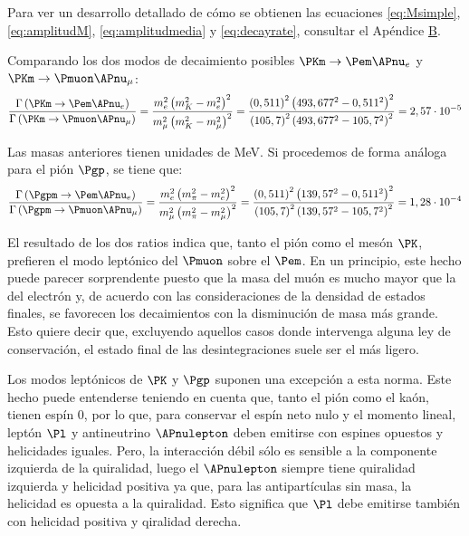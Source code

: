 Para ver un desarrollo detallado de cómo se obtienen las ecuaciones \ref{eq:Msimple}, \ref{eq:amplitudM}, \ref{eq:amplitudmedia} y \ref{eq:decayrate}, consultar el Apéndice \hyperref[cap:B]{B}.

Comparando los dos modos de decaimiento posibles $\PKm \rightarrow \Pem \APnu_{e}$ y $\PKm \rightarrow \Pmuon \APnu_{\mu}$:
\begin{equation}
\dfrac{\Gamma \left( \PKm \rightarrow \Pem \APnu_{e}\right) }{\Gamma \left( \PKm \rightarrow \Pmuon \APnu_{\mu}\right) }=\dfrac{m_{e}^{2}\left( m_{K}^{2}-m_{e}^{2}\right) ^{2}}{m_{\mu }^{2}\left( m_{K}^{2}-m_{\mu }^{2}\right) ^{2}}=\dfrac{\left( 0,511\right) ^{2}\left( 493,677^{2}-0,511^{2}\right) ^{2}}{\left( 105,7\right) ^{2}\left( 493,677^{2}-105,7^{2}\right) ^{2}}=2,57\cdot 10^{-5}\label{eq:BRkaon}
\end{equation}

Las masas anteriores tienen unidades de MeV. Si procedemos de forma análoga para el pión $\Pgp$, se tiene que:
\begin{equation}
\dfrac{\Gamma \left( \Pgpm \rightarrow \Pem \APnu_{e}\right) }{\Gamma \left( \Pgpm \rightarrow \Pmuon \APnu_{\mu}\right) }=\dfrac{m_{e}^{2}\left( m_{\pi}^{2}-m_{e}^{2}\right) ^{2}}{m_{\mu }^{2}\left( m_{\pi}^{2}-m_{\mu }^{2}\right) ^{2}}=\dfrac{\left( 0,511\right) ^{2}\left(139,57^{2}-0,511^{2}\right) ^{2}}{\left( 105,7\right) ^{2}\left( 139,57^{2}-105,7^{2}\right) ^{2}}=1,28\cdot 10^{-4}\label{eq:BRpion}
\end{equation}

El resultado de los dos ratios indica que, tanto el pión como el mesón $\PK$, prefieren el modo leptónico del $\Pmuon$ sobre el $\Pem$. En un principio, este hecho puede parecer sorprendente puesto que la masa del muón es mucho mayor que la del electrón y, de acuerdo con las consideraciones de la densidad de estados finales, se favorecen los decaimientos con la disminución de masa más grande. Esto quiere decir que, excluyendo aquellos casos donde intervenga alguna ley de conservación, el estado final de las desintegraciones suele ser el más ligero. 

Los modos leptónicos de $\PK$ y $\Pgp$ suponen una excepción a esta norma. Este hecho puede entenderse teniendo en cuenta que, tanto el pión como el kaón, tienen espín 0, por lo que, para conservar el espín neto nulo y el momento lineal, leptón $\Pl$ y antineutrino $\APnulepton$ deben emitirse con espines opuestos y helicidades iguales. Pero, la interacción débil sólo es sensible a la componente izquierda de la quiralidad, luego el $\APnulepton$ siempre tiene quiralidad izquierda y helicidad positiva ya que, para las antipartículas sin masa, la helicidad es opuesta a la quiralidad. Esto significa que $\Pl$ debe emitirse también con helicidad positiva y qiralidad derecha.

